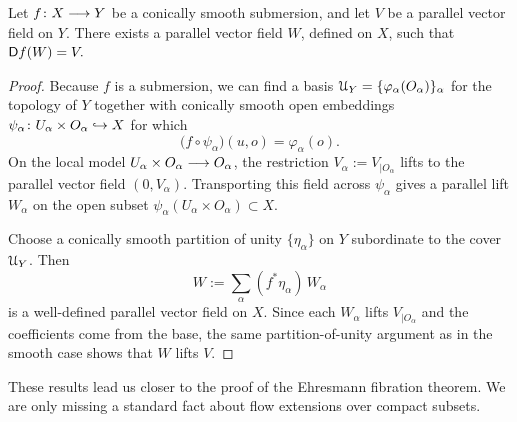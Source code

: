 \begin{proposition}\label{prop:lifts of vector fields}
    Let $f\colon X \longrightarrow Y$ be a conically smooth submersion, and let $V$ be a parallel vector field on $Y$. There exists a parallel vector field $W$, defined on $X$, such that $\mathsf D f(W) = V.$  
\end{proposition}
\begin{proof}
     Because $f$ is a submersion, we can find a basis $\mathcal U_{Y}= \{\varphi_\alpha(O_\alpha)\}_\alpha$ for the topology of $Y$ together with conically smooth open embeddings $\psi_\alpha \colon U_\alpha \times O_\alpha \hookrightarrow X$ for which 
    \begin{equation}
        \big(f\circ \psi_\alpha \big)(u,o) = \varphi_\alpha(o).
    \end{equation} 
    On the local model $U_\alpha \times O_\alpha \longrightarrow O_\alpha$, the restriction $V_\alpha := V_{|O_\alpha}$ lifts to the parallel vector field $(0,V_\alpha)$. Transporting this field across $\psi_\alpha$ gives a parallel lift $W_\alpha$ on the open subset $\psi_\alpha(U_\alpha\times O_\alpha)\subset X$.

    Choose a conically smooth partition of unity $\{\eta_\alpha\}$ on $Y$ subordinate to the cover $\mathcal U_Y$. Then
    \begin{equation}
        W:=\sum_\alpha (f^\ast\eta_\alpha)\,W_\alpha
    \end{equation}
    is a well-defined parallel vector field on $X$. Since each $W_\alpha$ lifts $V_{|O_\alpha}$ and the coefficients come from the base, the same partition-of-unity argument as in the smooth case shows that $W$ lifts $V$. 
\end{proof}

These results lead us closer to the proof of the Ehresmann fibration theorem. We are only missing a standard fact about flow extensions over compact subsets. 

